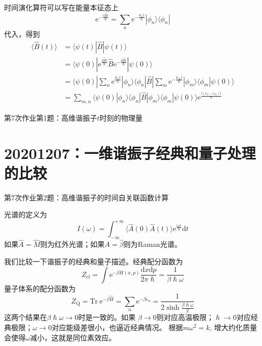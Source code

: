         时间演化算符可以写在能量本征态上
        \[ \mathrm{e}^{-\frac {\mathrm{i}\hat{H}t}{\hslash}} = \sum_n \mathrm{e}^{-\frac {\mathrm{i}\epsilon_n t}{\hslash}} |\phi_n \rangle \langle\phi_n| \]
        代入，得到 
        \begin{equation}\begin{aligned}
            \langle \hat{B}(t) \rangle &= \langle \psi(t)|\hat{B} | \psi(t) \rangle\\
            &= \langle \psi(0) |\mathrm{e}^{\frac {\mathrm{i}\hat{H}t}{\hslash}} \hat{B} \mathrm{e}^{-\frac {\mathrm{i}\hat{H}t}{\hslash}}|\psi(0) \rangle\\
            &= \langle \psi(0) |\sum_n \mathrm{e}^{\frac {\mathrm{i}\epsilon_n t}{\hslash}} |\phi_n \rangle \langle\phi_n|\hat{B}|\sum_m \mathrm{e}^{-\frac {\mathrm{i}\epsilon_m t}{\hslash}} |\phi_m \rangle \langle\phi_m|\psi(0)\rangle\\
            &= \sum_{m,n} \langle \psi(0)|\phi_n\rangle \langle \phi_n|\hat{B}|\phi_m \rangle \langle \phi_m|\psi(0)\rangle \mathrm{e}^{\frac {\mathrm{i}(\epsilon_n-\epsilon_m)t}{\hslash}}
        \end{aligned}\end{equation}
        \begin{asg}
            第7次作业第1题：高维谐振子$t$时刻的物理量
        \end{asg}

    \section{20201207：一维谐振子经典和量子处理的比较}
    \begin{asg}
        第7次作业第2题：高维谐振子的时间自关联函数计算
    \end{asg}

    光谱的定义为
    \[ I(\omega) = \int_{-\infty}^{+\infty} \langle \hat{A}(0)\hat{A}(t)\rangle \mathrm{e}^{\frac {\mathrm{i}\omega t}{\hslash}} \mathrm{d}t \]
    如果$\hat{A} = \hat{M}$则为红外光谱；如果$\hat{A} = \hat{\beta}$则为Raman光谱。

    我们比较一下谐振子的经典和量子描述。经典配分函数为
    \[ Z_\mathrm{cl} = \int \mathrm{e}^{-\beta H(x,p)}\frac {\mathrm{d}x\mathrm{d}p}{2\pi\hslash} = \frac 1{\beta\hslash\omega} \]
    量子体系的配分函数为
    \[ Z_\mathrm{Q} = \mathrm{Tr} \ \mathrm{e}^{-\beta \hat{H}} = \sum_n \mathrm{e}^{-\beta\epsilon_n} = \frac 1{2\sinh{\frac {\beta\hslash\omega}2}} \]
    这两个结果在$\beta\hslash\omega \to 0$时是一致的。如果
    $\beta \to 0$则对应高温极限；$\hslash \to 0$对应经典极限；$\omega \to 0$对应能级差很小，也逼近经典情况。
    根据$m\omega^2 = k$, 增大约化质量会使得$\omega$减小，这就是同位素效应。

